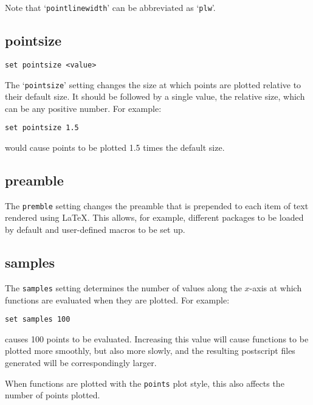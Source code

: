 \documentclass[a4paper,onecolumn,11pt]{book}
\begin{document}
Note that `{\tt pointlinewidth}' can be abbreviated as `{\tt plw}'.

\subsection{pointsize}

\begin{verbatim}
set pointsize <value>
\end{verbatim}

The `{\tt pointsize}' setting changes the size at which points are plotted
relative to their default size. It should be followed by a single value, the
relative size, which can be any positive number. For example:

\begin{verbatim}
set pointsize 1.5
\end{verbatim}

\noindent would cause points to be plotted 1.5 times the default size.

\subsection{preamble}

The {\tt premble} setting changes the preamble that is prepended to each item of
text rendered using \LaTeX{}.  This allows, for example, different packages to
be loaded by default and user-defined macros to be set up.

\subsection{samples}

The {\tt samples} setting determines the number of values along the $x$-axis at
which functions are evaluated when they are plotted. For example:

\begin{verbatim}
set samples 100
\end{verbatim}

\noindent causes 100 points to be evaluated.  Increasing this value will cause functions
to be plotted more smoothly, but also more slowly, and the resulting postscript
files generated will be correspondingly larger.

When functions are plotted with the {\tt points} plot style, this also affects
the number of points plotted.
\end{document}

